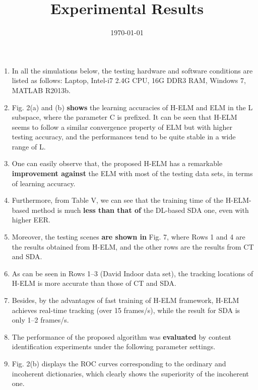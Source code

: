 \documentclass[onecolumn,conference]{IEEEtran}
\begin{document}
\title{Experimental Results}
\author{\today}
\maketitle
\begin{enumerate} 
\item In all the simulations below, the testing hardware and software conditions are listed as follows: Laptop, Intel-i7 2.4G CPU, 16G DDR3 RAM, Windows 7, MATLAB R2013b. \cite{Tang2015}
\item Fig. 2(a) and (b) \textbf{shows} the learning accuracies of H-ELM and ELM in the L subspace, where the parameter C is prefixed. It can be seen that H-ELM seems to follow a similar convergence property of ELM but with higher testing accuracy, and the performances tend to be quite stable in a wide range of L. \cite{Tang2015}
\item One can easily observe that, the proposed H-ELM has a remarkable \textbf{improvement against} the ELM with most of the testing data sets, in terms of learning accuracy.
 \cite{Tang2015}
\item Furthermore, from Table V, we can see that the training time of the H-ELM-based method is much \textbf{less than that of} the DL-based SDA one, even with higher EER. \cite{Tang2015}
\item Moreover, the testing scenes \textbf{are shown in} Fig. 7, where Rows 1 and 4 are the results obtained from H-ELM, and the other rows are the results from CT and SDA. \cite{Tang2015}
\item As can be seen in Rows 1–3 (David Indoor data set), the tracking locations of H-ELM is more accurate than those of CT and SDA. \cite{Tang2015}
\item Besides, by the advantages of fast training of H-ELM framework, H-ELM
achieves real-time tracking (over 15 frames/s), while the result for SDA is only 1–2 frames/s. \cite{Tang2015}
\item The performance of the proposed algorithm was \textbf{evaluated} by content identification experiments under the following parameter settings. \cite{Yue2015}
\item Fig. 2(b) displays the ROC curves corresponding to the ordinary and incoherent dictionaries, which clearly shows the superiority of the incoherent one. \cite{Yue2015}
\end{enumerate}


\end{document}
